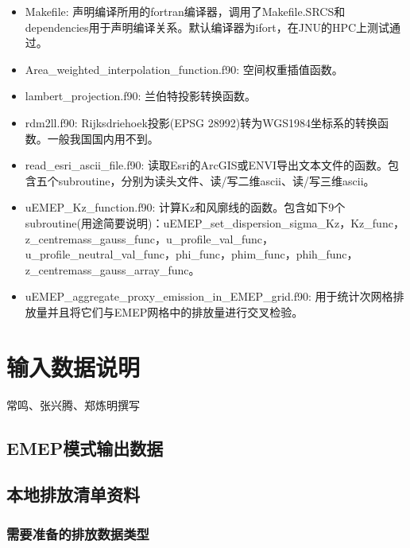 \documentclass{article}
\begin{document}
\begin{itemize}

\item Makefile:
声明编译所用的fortran编译器，调用了Makefile.SRCS和dependencies用于声明编译关系。默认编译器为ifort，在JNU的HPC上测试通过。

\item Area\_weighted\_interpolation\_function.f90:
空间权重插值函数。

\item lambert\_projection.f90:
兰伯特投影转换函数。

\item rdm2ll.f90:
Rijksdriehoek投影(EPSG 28992)转为WGS1984坐标系的转换函数。一般我国国内用不到。

\item read\_esri\_ascii\_file.f90:
读取Esri的ArcGIS或ENVI导出文本文件的函数。包含五个subroutine，分别为读头文件、读/写二维ascii、读/写三维ascii。

\item uEMEP\_Kz\_function.f90:
	计算Kz和风廓线的函数。包含如下9个subroutine(用途简要说明)：uEMEP\_set\_dispersion\_sigma\_Kz，Kz\_func，z\_centremass\_gauss\_func，u\_profile\_val\_func，u\_profile\_neutral\_val\_func，phi\_func，phim\_func，phih\_func，z\_centremass\_gauss\_array\_func。

\item uEMEP\_aggregate\_proxy\_emission\_in\_EMEP\_grid.f90:
用于统计次网格排放量并且将它们与EMEP网格中的排放量进行交叉检验。

\end{itemize}

\section{输入数据说明}

{\color{red} 常鸣、张兴腾、郑炼明撰写}

\subsection{EMEP模式输出数据}

\subsection{本地排放清单资料}

\subsubsection{需要准备的排放数据类型}
\end{document}
